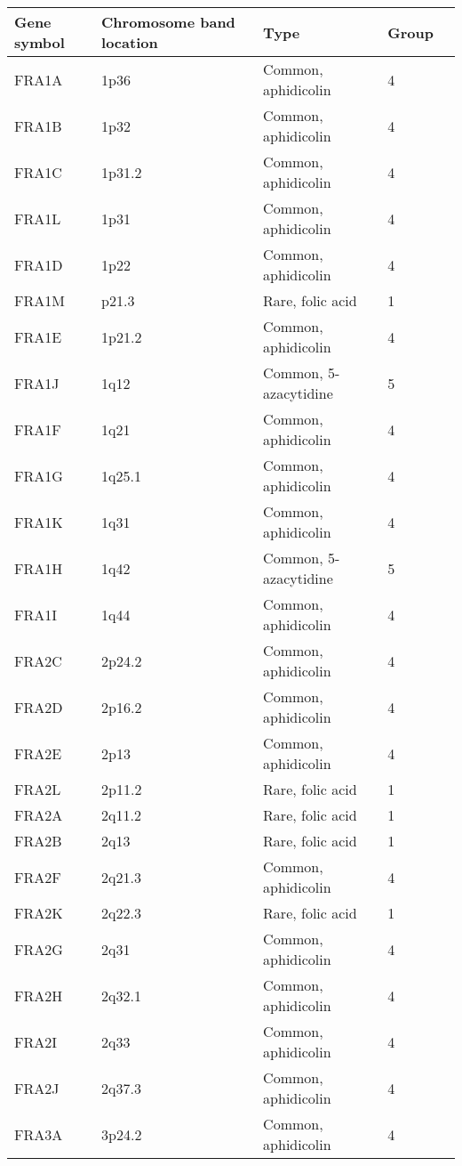 \documentclass[phd,tocprelim]{cornell}
\begin{document}
\begin{table}
  \begin{tabular}{l*{4}{l}}
    \toprule
     Gene symbol & Chromosome band location & Type & Group \\   \midrule
     FRA1A  & 1p36     & Common, aphidicolin   & 4 \\
     FRA1B  & 1p32     & Common, aphidicolin   & 4 \\
     FRA1C  & 1p31.2   & Common, aphidicolin   & 4 \\
     FRA1L  & 1p31     & Common, aphidicolin   & 4 \\
     FRA1D  & 1p22     & Common, aphidicolin   & 4 \\
     FRA1M  & p21.3    & Rare, folic acid    & 1 \\
     FRA1E  & 1p21.2   & Common, aphidicolin   & 4 \\
     FRA1J  & 1q12     & Common, 5-azacytidine & 5 \\
     FRA1F  & 1q21     & Common, aphidicolin   & 4 \\
     FRA1G  & 1q25.1   & Common, aphidicolin   & 4 \\
     FRA1K  & 1q31     & Common, aphidicolin   & 4 \\
     FRA1H  & 1q42     & Common, 5-azacytidine & 5 \\
     FRA1I  & 1q44     & Common, aphidicolin   & 4 \\
     FRA2C  & 2p24.2   & Common, aphidicolin   & 4 \\
     FRA2D  & 2p16.2   & Common, aphidicolin   & 4 \\
     FRA2E  & 2p13     & Common, aphidicolin   & 4 \\
     FRA2L  & 2p11.2   & Rare, folic acid    & 1 \\
     FRA2A  & 2q11.2   & Rare, folic acid    & 1 \\
     FRA2B  & 2q13     & Rare, folic acid    & 1 \\
     FRA2F  & 2q21.3   & Common, aphidicolin   & 4 \\
     FRA2K  & 2q22.3   & Rare, folic acid    & 1 \\
     FRA2G  & 2q31     & Common, aphidicolin   & 4 \\
     FRA2H  & 2q32.1   & Common, aphidicolin   & 4 \\
     FRA2I  & 2q33     & Common, aphidicolin   & 4 \\
     FRA2J  & 2q37.3   & Common, aphidicolin   & 4 \\
     FRA3A  & 3p24.2   & Common, aphidicolin   & 4 \\

\end{tabular}
\end{table}
\end{document}
